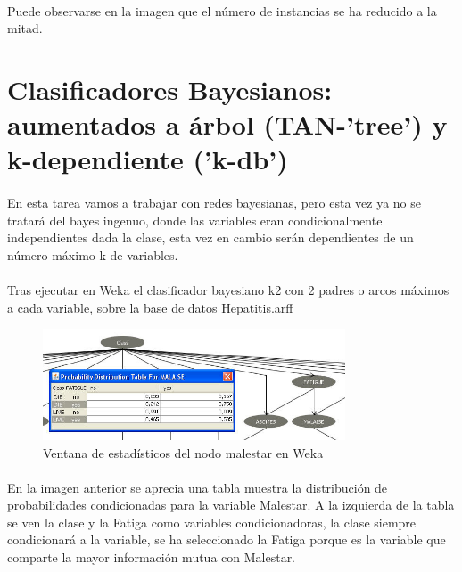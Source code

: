 \documentclass[es]{ifirak}
\begin{document}
\paragraph{}
Puede observarse en la imagen que el número de instancias se ha reducido a la mitad.

\section{Clasificadores Bayesianos: aumentados a árbol (TAN-'tree') y k-dependiente ('k-db')}
\paragraph{}
En esta tarea vamos a trabajar con redes bayesianas, pero esta vez ya no se tratará del bayes ingenuo, donde las variables eran condicionalmente independientes dada la clase, esta vez en cambio serán dependientes de un número máximo k de variables.
\paragraph{}
Tras ejecutar en Weka el clasificador bayesiano k2 con 2 padres o arcos máximos a cada variable, sobre la base de datos Hepatitis.arff

\begin{figure}[htbp]
\centering
\includegraphics[width=0.8\textwidth]{3Malestar.png}
\caption{Ventana de estadísticos del nodo malestar en Weka}\label{figure}
\end{figure}

\paragraph{}
En la imagen anterior se aprecia una tabla muestra la distribución de probabilidades condicionadas para la variable Malestar. A la izquierda de la tabla se ven la clase y la Fatiga como variables condicionadoras, la clase siempre condicionará a la variable, se ha seleccionado la Fatiga porque es la variable que comparte la mayor información mutua con Malestar.
\end{document}
